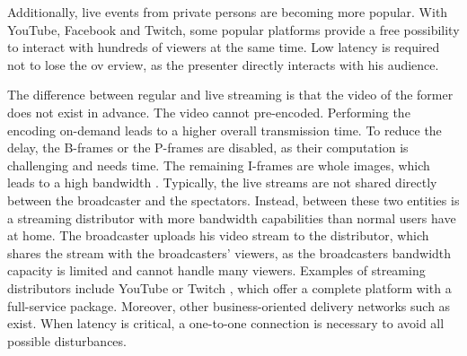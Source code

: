 Additionally, live events from private persons are becoming more popular. With YouTube, Facebook and Twitch, some popular platforms provide a free possibility to interact with hundreds of viewers at the same time. Low latency is required not to lose the ov erview, as the presenter directly interacts with his audience.
\par
The difference between regular and live streaming is that the video of the former does not exist in advance. The video cannot pre-encoded. Performing the encoding on-demand leads to a higher overall transmission time. To reduce the delay, the B-frames or the P-frames are disabled, as their computation is challenging and needs time. The remaining I-frames are whole images, which leads to a high bandwidth \parencite{Katto1995}. Typically, the live streams are not shared directly between the broadcaster and the spectators. Instead, between these two entities is a streaming distributor with more bandwidth capabilities than normal users have at home. The broadcaster uploads his video stream to the distributor, which shares the stream with the broadcasters’ viewers, as the broadcasters bandwidth capacity is limited and cannot handle many viewers. Examples of streaming distributors include YouTube \parencite{Youtube} or Twitch \parencite{Twitch}, which offer a complete platform with a full-service package. Moreover, other business-oriented delivery networks such as \cite{Akamai2020} exist. When latency is critical, a one-to-one connection is necessary to avoid all possible disturbances.

